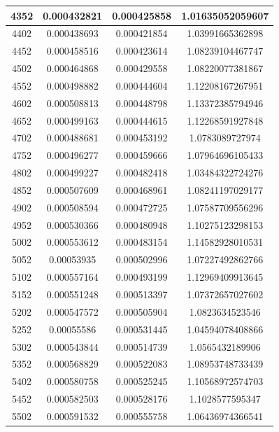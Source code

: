 \documentclass{article}
\begin{document}
\begin{longtable}{|c|c|c|c|}
		4352	&   0.000432821	  & 0.000425858	 &  1.01635052059607   \\ \hline
		4402	&   0.000438693	  & 0.000421854	 &  1.03991665362898   \\ \hline
		4452	&   0.000458516	  & 0.000423614	 &  1.08239104467747   \\ \hline
		4502	&   0.000464868	  & 0.000429558	 &  1.08220077381867   \\ \hline
		4552	&   0.000498882	  & 0.000444604	 &  1.12208167267951   \\ \hline
		4602	&   0.000508813	  & 0.000448798	 &  1.13372385794946   \\ \hline
		4652	&   0.000499163	  & 0.000444615	 &  1.12268591927848   \\ \hline
		4702	&   0.000488681	  & 0.000453192	 &  1.0783089727974   \\ \hline
		4752	&   0.000496277	  & 0.000459666	 &  1.07964696105433   \\ \hline
		4802	&   0.000499227	  & 0.000482418	 &  1.03484322724276   \\ \hline
		4852	&   0.000507609	  & 0.000468961	 &  1.08241197029177   \\ \hline
		4902	&   0.000508594	  & 0.000472725	 &  1.07587709556296   \\ \hline
		4952	&   0.000530366	  & 0.000480948	 &  1.10275123298153   \\ \hline
		5002	&   0.000553612	  & 0.000483154	 &  1.14582928010531   \\ \hline
		5052	&   0.00053935	  & 0.000502996	 &  1.07227492862766   \\ \hline
		5102	&   0.000557164	  & 0.000493199	 &  1.12969409913645   \\ \hline
		5152	&   0.000551248	  & 0.000513397	 &  1.07372657027602   \\ \hline
		5202	&   0.000547572	  & 0.000505904	 &  1.0823634523546   \\ \hline
		5252	&   0.00055586	  & 0.000531445	 &  1.04594078408866   \\ \hline
		5302	&   0.000543844	  & 0.000514739	 &  1.0565432189906   \\ \hline
		5352	&   0.000568829	  & 0.000522083	 &  1.08953748733439   \\ \hline
		5402	&   0.000580758	  & 0.000525245	 &  1.10568972574703   \\ \hline
		5452	&   0.000582503	  & 0.000528176	 &  1.1028577595347   \\ \hline
		5502	&   0.000591532	  & 0.000555758	 &  1.06436974366541   \\ \hline

\end{longtable}
\end{document}
